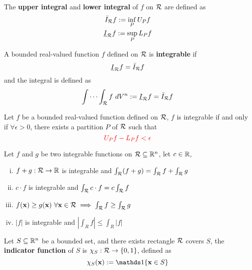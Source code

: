 \documentclass[11pt]{article}
\begin{document}
			\begin{definition}
				The \textbf{upper integral} and \textbf{lower integral} of $f$ on $\mathcal{{R}}$ are defined as
				\begin{gather}
					\bar{I}_{\mathcal{{R}}} f := \inf_{P} U_P f \\
					\underline{I}_{\mathcal{{R}}} f := \sup_{P} L_P f
				\end{gather}
			\end{definition}
			
			\begin{definition}
				A bounded real-valued function $f$ defined on $\mathcal{{R}}$ is \textbf{integrable} if
				\begin{equation}
					\underline{I}_{\mathcal{{R}}} f = \bar{I}_{\mathcal{{R}}} f
				\end{equation}
				and the integral is defined as
				\begin{equation}
					\int \cdots \int_{\mathcal{{R}}} f\ dV^n := \underline{I}_{\mathcal{{R}}} f = \bar{I}_{\mathcal{{R}}} f
				\end{equation}
			\end{definition}
			
			\begin{lemma}
				Let $f$ be a bounded real-valued function defined on $\mathcal{{R}}$, $f$ is integrable if and only if $\forall \epsilon > 0$, there exists a partition $P$ of $\mathcal{{R}}$ such that
				\begin{equation}
					\textcolor{red}{U_P f - L_P f < \epsilon}
				\end{equation}
			\end{lemma}
			
			\begin{theorem}
				Let $f$ and $g$ be two integrable functions on $\mathcal{{R}} \subseteq \mathbb{R}^n$, let $c \in \mathbb{R}$, 
				\begin{enumerate}[(i)]
					\item $f+g:\mathcal{{R}} \to \mathbb{R}$ is integrable and $\int_{\mathcal{{R}}} (f+g) = \int_{\mathcal{{R}}} f + \int_{\mathcal{{R}}} g$
					\item $c \cdot f$ is integrable and $\int_{\mathcal{{R}}} c \cdot f = c \int_{\mathcal{{R}}} f$
					\item $f(\textbf{x}) \geq g(\textbf{x})\ \forall \textbf{x} \in \mathcal{{R}} \implies \int_{\mathcal{{R}}} f \geq \int_{\mathcal{{R}}} g$
					\item $|f|$ is integrable and $|\int_{R} f| \leq \int_{R} |f|$
				\end{enumerate}
			\end{theorem}
			
			\begin{definition}
				Let $S \subseteq \mathbb{R}^n$ be a bounded set, and there exists rectangle $\mathcal{{R}}$ covers $S$, the \textbf{indicator function} of $S$ is $\chi_S: \mathcal{{R}} \to \{0, 1\}$, defined as
				\begin{equation}
					\chi_S (\ve{x}) := \id{\ve{x} \in S}
				\end{equation}
			\end{definition}
			
\end{document}
